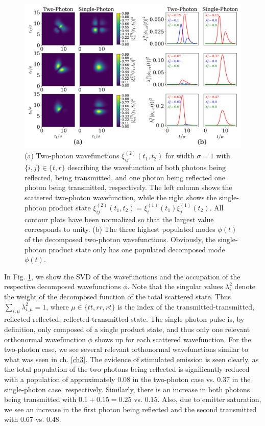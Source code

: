 \begin{figure}[H]
    \centering
    \includegraphics[width=\linewidth]{figures/lodahl_fig3.pdf}
    \caption{(a) Two-photon wavefunctions $\xi^{(2)}_{ij}(t_1,t_2)$ for width $\sigma = 1$ with $\{i,j\} \in \{t,r\}$ describing the wavefunction of both photons being reflected, being transmitted, and one photon being reflected one photon being transmitted, respectively. The left column shows the scattered two-photon wavefunction, while the right shows the single-photon product state $\xi^{(2)}_{ij}(t_1,t_2) = \xi^{(1)}_{i}(t_1)\xi^{(1)}_{j}(t_2)$. All contour plots have been normalized so that the largest value corresponds to unity. (b) The three highest populated modes $\phi(t)$ of the decomposed two-photon wavefunctions. Obviously, the single-photon product state only has one populated decomposed mode $\phi(t)$.}
    \label{fig:lodahlfig3}
\end{figure}

In Fig. \ref{fig:lodahlfig3}, we show the SVD of the wavefunctions and the occupation of the respective decomposed wavefunctions $\phi$. Note that the singular values $\lambda_i^2$ denote the weight of the decomposed function of the total scattered state. Thus $\sum_{i,\mu} \lambda_{i,\mu}^2 = 1$, where $\mu \in \{tt,rr,rt\}$ is the index of the transmitted-transmitted, reflected-reflected, reflected-transmitted state. The single-photon pulse is, by definition, only composed of a single product state, and thus only one relevant orthonormal wavefunction $\phi$ shows up for each scattered wavefunction. For the two-photon case, we see several relevant orthonormal wavefunctions similar to what was seen in ch. \ref{ch3}. The evidence of stimulated emission is seen clearly, as the total population of the two photons being reflected is  significantly reduced with a population of approximately $0.08$ in the two-photon case vs. $0.37$ in the single-photon case, respectively. Similarly, there is an increase in both photons being transmitted with $0.1+0.15 = 0.25$ vs. $0.15$. Also, due to emitter saturation, we see an increase in the first photon being reflected and the second transmitted with $0.67$ vs. $0.48$.







